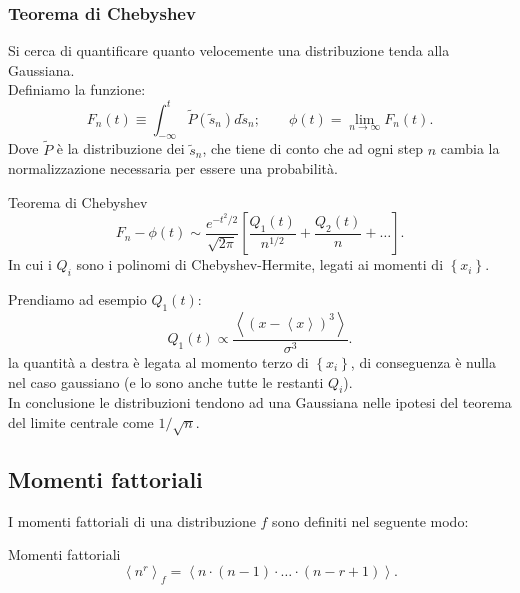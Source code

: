 \subsubsection{Teorema di Chebyshev}%
\label{subsub:Teorema di Chebyshev}
Si cerca di quantificare quanto velocemente una distribuzione tenda alla Gaussiana.\\
Definiamo la funzione:
\[
    F_n(t) \equiv \int_{-\infty}^{t} \tilde{P}(\tilde{s}_n)d\tilde{s}_n;  \qquad \phi (t) = \lim_{n \to \infty} F_n(t) 
.\] 
Dove $\tilde{P}$ è la distribuzione dei $\tilde{s}_n$, che tiene di conto che ad ogni step $n$ cambia la normalizzazione necessaria per essere una probabilità.
\begin{redbox}{Teorema di Chebyshev}
    \[
	F_n-\phi (t) \sim \frac{e^{-t^2 /2}}{\sqrt{2\pi}}\left[\frac{Q_1(t)}{n^{1 /2}} + \frac{Q_2(t)}{n} + \ldots\right]
    .\] 
    In cui i $Q_i$ sono i polinomi di Chebyshev-Hermite, legati ai momenti di $\left\{x_i\right\}$.
\end{redbox}
\noindent
Prendiamo ad esempio $Q_1(t)$:
\[
    Q_1(t) \propto \frac{\left<\left(x-\left<x\right>\right)^3\right>}{\sigma^3}
.\] 
la quantità a destra è legata al momento terzo di $\left\{x_i\right\}$, di conseguenza è nulla nel caso gaussiano (e lo sono anche tutte le restanti $Q_i$).\\
In conclusione le distribuzioni tendono ad una Gaussiana nelle ipotesi del teorema del limite centrale come $1 / \sqrt{n} $.

\subsection{Momenti fattoriali}%
\label{sub:Momenti fattoriali}
I momenti fattoriali di una distribuzione $f$ sono definiti nel seguente modo:
\begin{redbox}{Momenti fattoriali}
    \[
	\left<n^r\right>_f = \left<n\cdot (n-1) \cdot \ldots \cdot (n-r+1) \right>
    .\] 
\end{redbox}
\noindent
